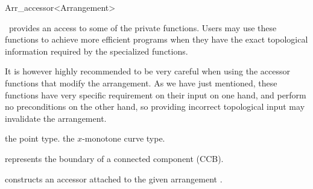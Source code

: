 
\ccRefPageBegin

\begin{ccRefClass}{Arr_accessor<Arrangement>}
\label{arr_ref:arr_access}

\ccDefinition

\ccClassTemplateName\ provides an access to some of the private
 functions. Users may use these functions to achieve
more efficient programs when they have the exact topological information
required by the specialized functions.

It is however highly recommended to be very careful when using the
accessor functions that modify the arrangement. As we have just mentioned,
these functions have very specific requirement on their input on one hand,
and perform no preconditions on the other hand, so providing incorrect
topological input may invalidate the arrangement.


\ccTypes


    {the point type.}
\ccGlue
{}
    {the $x$-monotone curve type.}

\ccGlue
{}
\ccGlue
{}
\ccGlue
{}
    {represents the boundary of a connected component (CCB).}

\ccCreation
{}

    {constructs an accessor attached to the given arrangement 
     .}



\end{ccRefClass}

